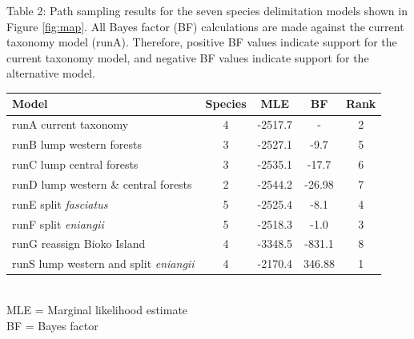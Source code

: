 {Table 2: Path sampling results for the seven species delimitation models shown in Figure \ref{fig:map}. All Bayes factor (BF) calculations are made against the current taxonomy model (runA). Therefore, positive BF values indicate support for the current taxonomy model, and negative BF values indicate support for the alternative model.
\begin{table}[ht]
\tabcolsep=0.2cm
\begin{tabular}{l c c c c } 
\hline     
Model 							& Species 	& MLE 	& BF 		& Rank\\\hline
runA     current taxonomy   & 4     &   -2517.7    &   -   &   2\\
runB     lump western forests   & 3     &   -2527.1    &   -9.7   &   5\\
runC     lump central forests   & 3     &   -2535.1    &   -17.7  &   6\\
runD     lump western \& central forests    & 2     &   -2544.2    &   -26.98  &   7\\
runE     split \textit{fasciatus}   & 5     &   -2525.4    &   -8.1    &   4\\
runF     split \textit{eniangii}    & 5     &   -2518.3    &   -1.0  &   3\\
runG     reassign Bioko Island  & 4     &   -3348.5    &   -831.1 &   8\\
runS    lump western and split \textit{eniangii}    &4  &   -2170.4    &   346.88  &   1\\
\end{tabular}\\
MLE = Marginal likelihood estimate\\
BF = Bayes factor\\
\end{table}
}


